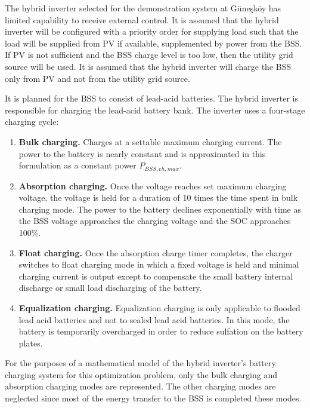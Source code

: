 The hybrid inverter selected for the demonstration system at Güneşköy has limited capability to receive external control. It is assumed that the hybrid inverter will be configured with a priority order for supplying load such that the load will be supplied from PV if available, supplemented by power from the BSS. If PV is not sufficient and the BSS charge level is too low, then the utility grid source will be used. It is assumed that the hybrid inverter will charge the BSS only from PV and not from the utility grid source.

It is planned for the BSS to consist of lead-acid batteries. The hybrid inverter is responsible for charging the lead-acid battery bank. The inverter uses a four-stage charging cycle:

\begin{enumerate}
	\item \textbf{Bulk charging.} Charges at a settable maximum charging current. The power to the battery is nearly constant and is approximated in this formulation as a constant power $P_{BSS,ch,max}$.
	\item \textbf{Absorption charging.} Once the voltage reaches set maximum charging voltage, the voltage is held for a duration of 10 times the time spent in bulk charging mode. The power to the battery declines exponentially with time as the BSS voltage approaches the charging voltage and the SOC approaches 100\%.
	\item \textbf{Float charging.} Once the absorption charge timer completes, the charger switches to float charging mode in which a fixed voltage is held and minimal charging current is output except to compensate the small battery internal discharge or small load discharging of the battery.
	\item \textbf{Equalization charging.} Equalization charging is only applicable to flooded lead acid batteries and not to sealed lead acid batteries. In this mode, the battery is temporarily overcharged in order to reduce sulfation on the battery plates.
\end{enumerate}

For the purposes of a mathematical model of the hybrid inverter's battery charging system for this optimization problem, only the bulk charging and absorption charging modes are represented. The other charging modes are neglected since most of the energy transfer to the BSS is completed these modes.

